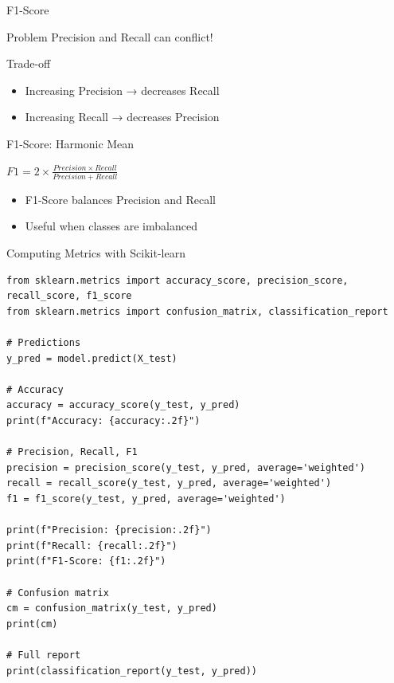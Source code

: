 \documentclass[aspectratio=169]{beamer}
\begin{document}
\begin{frame}{F1-Score}
\begin{block}{Problem}
Precision and Recall can conflict!
\end{block}

\begin{alertblock}{Trade-off}
\begin{itemize}
    \item Increasing Precision → decreases Recall
    \item Increasing Recall → decreases Precision
\end{itemize}
\end{alertblock}

\vspace{0.3cm}
\begin{block}{F1-Score: Harmonic Mean}
\begin{center}
\Large
$F1 = 2 \times \frac{Precision \times Recall}{Precision + Recall}$
\end{center}
\end{block}

\vspace{0.3cm}
\begin{itemize}
    \item F1-Score balances Precision and Recall
    \item Useful when classes are imbalanced
\end{itemize}
\end{frame}

\begin{frame}[fragile]{Computing Metrics with Scikit-learn}
\begin{lstlisting}
from sklearn.metrics import accuracy_score, precision_score, recall_score, f1_score
from sklearn.metrics import confusion_matrix, classification_report

# Predictions
y_pred = model.predict(X_test)

# Accuracy
accuracy = accuracy_score(y_test, y_pred)
print(f"Accuracy: {accuracy:.2f}")

# Precision, Recall, F1
precision = precision_score(y_test, y_pred, average='weighted')
recall = recall_score(y_test, y_pred, average='weighted')
f1 = f1_score(y_test, y_pred, average='weighted')

print(f"Precision: {precision:.2f}")
print(f"Recall: {recall:.2f}")
print(f"F1-Score: {f1:.2f}")

# Confusion matrix
cm = confusion_matrix(y_test, y_pred)
print(cm)

# Full report
print(classification_report(y_test, y_pred))
\end{lstlisting}
\end{frame}
\end{document}
